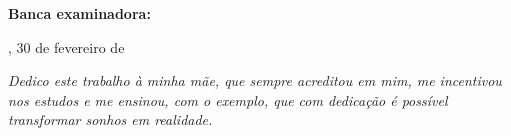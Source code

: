 \documentclass[
	12pt,				%
	openright,			%
	oneside,			%
	a4paper,			%
	english,			%
	french,				%
	spanish,			%
	brazil,				%
	]{abntex2}
\begin{document}
% 
 \begin{folhadeaprovacao}

  \begin{center}
     {\ABNTEXchapterfont\large\imprimirautor}

     \vspace*{\fill}\vspace*{\fill}
     \begin{center}
      \ABNTEXchapterfont\bfseries\large\imprimirtitulo
     \end{center}
     \vspace*{\fill}

     \hspace{.45\textwidth}
     \begin{minipage}{.5\textwidth}
         \imprimirpreambulo
     \end{minipage}%
     \vspace*{\fill}
   \end{center}
        
   \textbf{Banca examinadora:} 

  

   \begin{center}
     \vspace*{0.5cm}
     {\large\imprimirlocal}, \large{30 de fevereiro de} 
     {\large\imprimirdata}
     \vspace*{1cm}
  \end{center}
  
 \end{folhadeaprovacao}

\begin{dedicatoria}
     \vspace*{\fill}
 	\begin{flushright}
  		\textit{Dedico este trabalho à minha mãe, que sempre acreditou em mim, me incentivou nos estudos e me ensinou, com o exemplo, que com dedicação é possível transformar sonhos em realidade. 
  		}
  	\end{flushright}
\end{dedicatoria}
\end{document}
